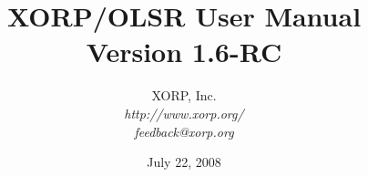\documentclass[11pt]{book}
\begin{document}
\title{{\Huge XORP/OLSR User Manual}\\
\vspace{1ex}
Version 1.6-RC}
\author{ XORP, Inc.					\\
         {\it http://www.xorp.org/}			\\
	 {\it feedback@xorp.org}
}
\date{July 22, 2008}

\maketitle


%
%
\newcommand{\xorp}{{\small XORP}\xspace}
\newcommand{\xorpsh}{{\sf\small xorpsh}\xspace}
\newcommand{\rtrmgr}{{\sf\small xorp\_rtrmgr}\xspace}
\newcommand{\stt}{\tt\small}
\newcommand{\ssf}{\sf\small}




\tableofcontents




\end{document}
